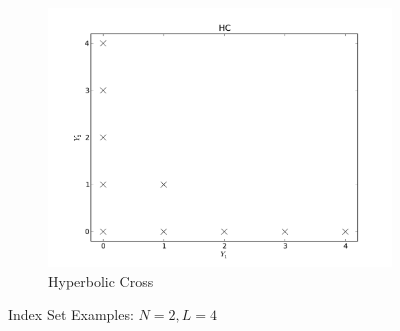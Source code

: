 \documentclass{mc2015}
\begin{document}
\begin{figure}[h]
\begin{subfigure}[b]{0.32 \textwidth}
   \includegraphics[width=\textwidth]{HC}
   \caption{Hyperbolic Cross}
   \label{HC}
  \end{subfigure}
  \caption{Index Set Examples: $N=2,L=4$}
  \label{indexsets}
\end{figure}
\end{document}
